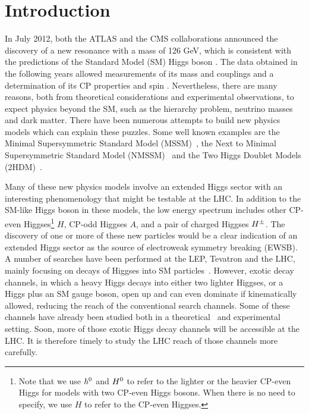 \section{Introduction}
\label{sec:intro}

In July 2012,  both the ATLAS and the CMS collaborations announced the discovery of a new resonance with a mass of 126 GeV,  which is consistent with the predictions of the Standard Model (SM) Higgs boson \cite{Aad:2012tfa,  Chatrchyan:2012xdj}. The data obtained in the following years allowed   measurements of its mass and couplings and a determination of its CP properties and spin \cite{ATLAS:2013sla,CMS:yva,Aad:2013xqa}.  Nevertheless, there are many reasons, both from theoretical considerations and experimental observations, to expect physics beyond the SM, such as the hierarchy problem, neutrino masses and dark matter.  There have been numerous attempts to build new physics models which can explain these puzzles. Some well known examples are the Minimal Supersymmetric Standard Model (MSSM)~\cite{Nilles:1983ge,Haber:1984rc,Barbieri:1987xf}, the Next to Minimal Supersymmetric Standard Model (NMSSM)~\cite{Ellis:1988er,Drees:1988fc} and the Two Higgs Doublet Models (2HDM)~\cite{Branco:2011iw,Haber:1978jt,Hall:1981bc,Donoghue:1978cj}.  

Many of these new physics models involve an extended Higgs sector with an interesting phenomenology that might be testable  at the LHC. In addition to the SM-like Higgs boson in these models, the low energy spectrum includes other CP-even Higgses\footnote{Note that we use $h^0$ and $H^0$ to refer to the lighter or the heavier CP-even Higgs for models with two CP-even Higgs bosons.  When there is no need to specify, we use $H$ to refer to the CP-even Higgses.} $H$, CP-odd Higgses $A$, and a pair of  charged  Higgses $H^{\pm}$. The discovery of one or more of these new particles would be a clear indication of an extended Higgs sector as the source of electroweak symmetry breaking (EWSB). A number of searches have been performed at the LEP, Tevatron and the LHC, mainly focusing on decays of Higgses into SM particles~\cite{LEP_Higgs, Aad:2014vgg, Khachatryan:2014wca, TheATLAScollaboration:2013wia, CMS:2014cdp, Aad:2013hla, CMS:2014kga, Khachatryan:2015cwa}.   However, exotic decay channels, in which a heavy Higgs decays into  either  two lighter Higgses, or a Higgs plus an SM gauge boson,   open up and can even dominate if kinematically allowed, reducing the reach of the conventional search channels.  Some of these channels have already been studied both in a theoretical~\cite{Curtin:2013fra, Brownson:2013lka, Coleppa:2014hxa, Coleppa:2014cca,Li:2015lra,Dorsch:2014qja,Chen:2013emb,Chen:2014dma,Enberg:2014pua}  and experimental~\cite{Aad:2015wra, CMS:2014yra,CMS:2013eua} setting.  Soon, more of those  exotic Higgs decay channels will   be accessible  at the LHC.   It is therefore timely to study the LHC reach of those channels more carefully.  

